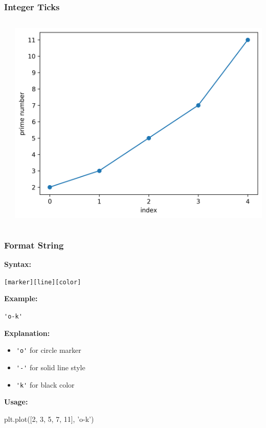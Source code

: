 \documentclass[xcolor={svgnames}]{beamer}
\newcommand{\pycode}[2][]{\lstinline[style=python,#1]{#2}}
\newcommand{\pyfile}[2][]{}
\begin{document}
\begin{frame}[t,fragile]
    \frametitle{Integer Ticks}
    \vspace{5mm}
    \begin{columns}[T]
        \begin{column}{0.52\textwidth}
            \pyfile{examples/06-ticks.py}
        \end{column}
        \begin{column}{0.48\textwidth}
            \includegraphics[width=\textwidth]{img/06-ticks.png}
        \end{column}
    \end{columns}
\end{frame}


\begin{frame}[t,fragile]
    \frametitle{Format String}

    \textbf{Syntax:}

    \pycode{[marker][line][color]}

    \medskip
    \pause

    \textbf{Example:}

    \pycode{'o-k'}

    \medskip
    \pause

    \textbf{Explanation:}
    \begin{itemize}
        \item \pycode{'o'} for circle marker
        \item \pycode{'-'} for solid line style
        \item \pycode{'k'} for black color
    \end{itemize}

    \medskip
    \pause

    \textbf{Usage:}

    \begin{pyenv}[gobble=8]
        plt.plot([2, 3, 5, 7, 11], 'o-k')
    \end{pyenv}

\end{frame}
\end{document}
